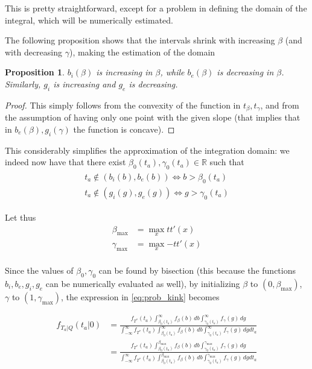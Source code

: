 \documentclass{article}
\newtheorem{prop}{Proposition}
\begin{document}
This is pretty straightforward, except for a problem in defining the domain of the integral, which will be numerically estimated.

The following proposition shows that the intervals shrink with increasing \(\beta\) (and with decreasing \(\gamma\)), making the estimation of the domain
\begin{prop}
  \(b_i(\beta)\) is increasing in \(\beta\), while \(b_e(\beta)\) is decreasing in \(\beta\).
  Similarly, \(g_i\) is increasing and \(g_e\) is decreasing.
\end{prop}
\begin{proof}
  This simply follows from the convexity of the function in \(t_\beta, t_\gamma\), and from the assumption of having only one point with the given slope (that implies that in \(b_e(\beta), g_i(\gamma)\) the function is concave).
\end{proof}
This considerably simplifies the approximation of the integration domain:
we indeed now have that there exist \(\beta_0(t_a), \gamma_0(t_a) \in \mathbb{R}\) such that
\begin{align}
  \label{eq:threshold_integration}
  \begin{split}
     t_a \not\in (b_i(b), b_e(b)) \iff b > \beta_0(t_a) \\
    t_a \not\in (g_i(g), g_e(g)) \iff g > \gamma_0(t_a)
  \end{split}
\end{align}

Let thus
\begin{align*}
  \beta_\text{max} & = \max_x{tt'(x)} \\
  \gamma_\text{max} & = \max_x{-tt'(x)} \\
\end{align*}

Since the values of \(\beta_0, \gamma_0\) can be found by bisection (this because the functions \(b_i, b_e, g_i, g_e\) can be numerically evaluated as well), by initializing \(\beta\) to \((0, \beta_\text{max})\), \(\gamma\) to \((1, \gamma_\text{max})\), the expression in \eqref{eq:prob_kink} becomes

\begin{align*}
  f_{T_a | Q}(t_a | 0) & = \frac{f_{T^*}(t_a)\int_{\beta_0(t_a)}^\infty f_\beta(b)\, db\int_{\gamma_0(t_a)}^\infty f_\gamma(g)\, dg}{\int_{-\infty}^\infty f_{T^*}(t_a)\int_{\beta_0(t_a)}^\infty f_\beta(b)\, db\int_{\gamma_0(t_a)}^\infty f_\gamma(g)\, dgdt_a} \\
  & = \frac{f_{T^*}(t_a)\int_{\beta_0(t_a)}^{\beta_\text{max}}f_\beta(b)\, db\int_{\gamma_0(t_a)}^{\gamma_\text{max}}f_\gamma(g)\, dg}{\int_{-\infty}^\infty f_{T^*}(t_a)\int_{\beta_0(t_a)}^{\beta_\text{max}}f_\beta(b)\, db\int_{\gamma_0(t_a)}^{\gamma_\text{max}}f_\gamma(g)\, dgdt_a}\tag{\theequation}\label{eq:on_time}
\end{align*}
\end{document}
